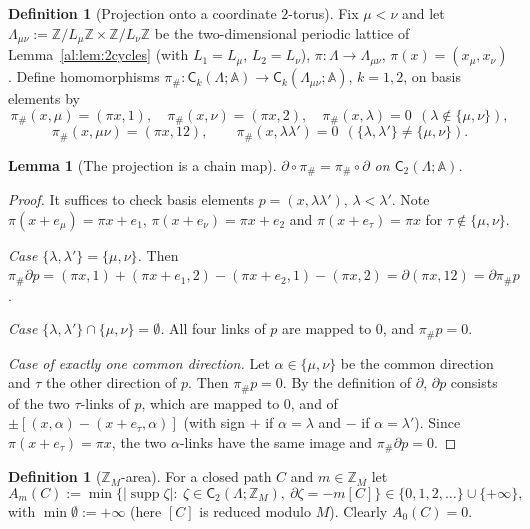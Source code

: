 \documentclass[11pt,a4paper]{article}
\newtheorem{lemma}[theorem]{Lemma}
\theoremstyle{definition}
\newtheorem{definition}[theorem]{Definition}
\theoremstyle{remark}
\DeclareMathOperator{\supp}{supp}
\newcommand{\Z}{\mathbb{Z}}
\newcommand{\sC}{\mathsf{C}}
\newcommand{\bA}{\mathbb{A}}
\begin{document}
\begin{definition}[Projection onto a coordinate $2$-torus]\label{al:def:proj}
Fix $\mu<\nu$ and let $\Lambda_{\mu\nu}:=\Z/L_\mu\Z\times\Z/L_\nu\Z$ be the two-dimensional periodic lattice of
Lemma~\ref{al:lem:2cycles} (with $L_1=L_\mu$, $L_2=L_\nu$), $\pi:\Lambda\to\Lambda_{\mu\nu}$, $\pi(x)=(x_\mu,x_\nu)$. Define
homomorphisms $\pi_\#:\sC_k(\Lambda;\bA)\to\sC_k(\Lambda_{\mu\nu};\bA)$, $k=1,2$, on basis elements by
\[
\pi_\#(x,\mu)=(\pi x,1),\quad \pi_\#(x,\nu)=(\pi x,2),\quad \pi_\#(x,\lambda)=0\ \ (\lambda\notin\{\mu,\nu\}),
\]
\[
\pi_\#(x,\mu\nu)=(\pi x,12),\qquad \pi_\#(x,\lambda\lambda')=0\ \ (\{\lambda,\lambda'\}\neq\{\mu,\nu\}).
\]
\end{definition}

\begin{lemma}[The projection is a chain map]\label{al:lem:chainmap}
$\partial\circ\pi_\#=\pi_\#\circ\partial$ on $\sC_2(\Lambda;\bA)$.
\end{lemma}

\begin{proof}
It suffices to check basis elements $p=(x,\lambda\lambda')$, $\lambda<\lambda'$. Note $\pi(x+e_\mu)=\pi x+e_1$,
$\pi(x+e_\nu)=\pi x+e_2$ and $\pi(x+e_\tau)=\pi x$ for $\tau\notin\{\mu,\nu\}$.

\emph{Case $\{\lambda,\lambda'\}=\{\mu,\nu\}$.} Then
$\pi_\#\partial p=(\pi x,1)+(\pi x+e_1,2)-(\pi x+e_2,1)-(\pi x,2)=\partial(\pi x,12)=\partial\pi_\#p$.

\emph{Case $\{\lambda,\lambda'\}\cap\{\mu,\nu\}=\emptyset$.} All four links of $p$ are mapped to $0$, and $\pi_\#p=0$.

\emph{Case of exactly one common direction.} Let $\alpha\in\{\mu,\nu\}$ be the common direction and $\tau$ the other
direction of $p$. Then $\pi_\#p=0$. By the definition of $\partial$, $\partial p$ consists of the two $\tau$-links of
$p$, which are mapped to $0$, and of $\pm[(x,\alpha)-(x+e_\tau,\alpha)]$ (with sign $+$ if $\alpha=\lambda$ and $-$ if
$\alpha=\lambda'$). Since $\pi(x+e_\tau)=\pi x$, the two $\alpha$-links have the same image and $\pi_\#\partial p=0$.
\end{proof}

\begin{definition}[$\Z_M$-area]\label{al:def:area}
For a closed path $C$ and $m\in\Z_M$ let
\[
A_m(C):=\min\bigl\{|\supp\zeta|:\ \zeta\in\sC_2(\Lambda;\Z_M),\ \partial\zeta=-m[C]\bigr\}\in\{0,1,2,\dots\}\cup\{+\infty\},
\]
with $\min\emptyset:=+\infty$ (here $[C]$ is reduced modulo $M$). Clearly $A_0(C)=0$.
\end{definition}
\end{document}
